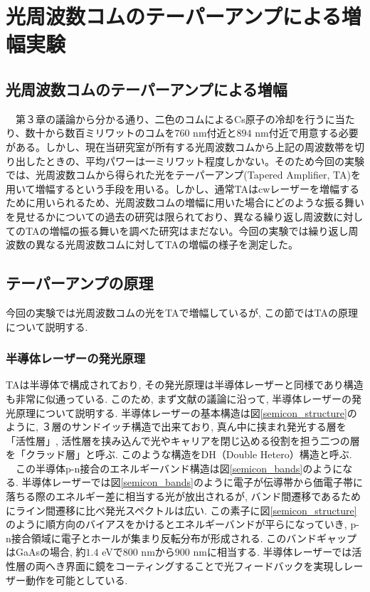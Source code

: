 \documentclass[uplatex, dvipdfmx, a4paper, report, papersize, 11pt]{jsbook}
\begin{document}
\newpage
\chapter{光周波数コムのテーパーアンプによる増幅実験}

\section{光周波数コムのテーパーアンプによる増幅}
　第３章の議論から分かる通り、二色のコムによるCs原子の冷却を行うに当たり、数十から数百ミリワットのコムを$760$ nm付近と$894$ nm付近で用意する必要がある。しかし、現在当研究室が所有する光周波数コムから上記の周波数帯を切り出したときの、平均パワーは一ミリワット程度しかない。そのため今回の実験では、光周波数コムから得られた光をテーパーアンプ(Tapered Amplifier,  TA)を用いて増幅するという手段を用いる。しかし、通常TAはcwレーザーを増幅するために用いられるため、光周波数コムの増幅に用いた場合にどのような振る舞いを見せるかについての過去の研究は限られており、異なる繰り返し周波数に対してのTAの増幅の振る舞いを調べた研究はまだない。今回の実験では繰り返し周波数の異なる光周波数コムに対してTAの増幅の様子を測定した。

\section{テーパーアンプの原理}
今回の実験では光周波数コムの光をTAで増幅しているが, この節ではTAの原理について説明する.

\subsection{半導体レーザーの発光原理}
TAは半導体で構成されており, その発光原理は半導体レーザーと同様であり構造も非常に似通っている. このため, まず文献\cite{わかる半導体レーザーの基礎と応用}の議論に沿って, 半導体レーザーの発光原理について説明する. 半導体レーザーの基本構造は図\ref{semicon_structure}のように, ３層のサンドイッチ構造で出来ており, 真ん中に挟まれ発光する層を「活性層」, 活性層を挟み込んで光やキャリアを閉じ込める役割を担う二つの層を「クラッド層」と呼ぶ. このような構造をDH（Double Hetero）構造と呼ぶ.\\
　この半導体p-n接合のエネルギーバンド構造は図\ref{semicon_bands}のようになる. 半導体レーザーでは図\ref{semicon_bands}のように電子が伝導帯から価電子帯に落ちる際のエネルギー差に相当する光が放出されるが, バンド間遷移であるためにライン間遷移に比べ発光スペクトルは広い. この素子に図\ref{semicon_structure}のように順方向のバイアスをかけるとエネルギーバンドが平らになっていき, p-n接合領域に電子とホールが集まり反転分布が形成される. このバンドギャップはGaAsの場合, 約$1.4$ eVで$800$ nmから$900$ nmに相当する\cite{grynberg_aspect_fabre_cohen-tannoudji_2010}. 半導体レーザーでは活性層の両へき界面に鏡をコーティングすることで光フィードバックを実現しレーザー動作を可能としている.
\end{document}
